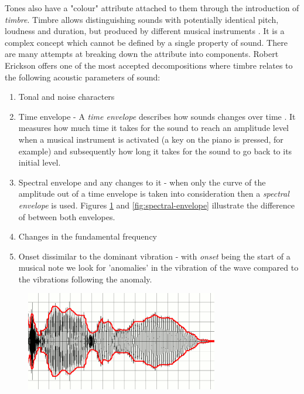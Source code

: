 Tones also have a "colour" attribute attached to them through the introduction
of \textit{timbre}. Timbre allows distinguishing sounds with potentially
identical pitch, loudness and duration, but produced by different musical
instruments \cite{klapuri2007signal}. It is a complex concept which cannot be
defined by a single property of sound. There are many attempts at breaking down
the attribute into components. Robert Erickson \cite{erickson1975sound} offers
one of the most accepted decompositions where timbre relates to the following
acoustic parameters of sound:
\begin{enumerate}
    \item Tonal and noise characters
    \item Time envelope - A \textit{time envelope} describes how sounds changes
    over time \cite{wiki:envelope}. It measures how much time it takes for the sound to reach an
    amplitude level when a musical instrument is activated (a key on the piano
    is pressed, for example) and subsequently how long it takes for the sound to
    go back to its initial level. 
    \item Spectral envelope and any changes to it - when only the curve of the
    amplitude out of a time envelope is taken into consideration then a
    \textit{spectral envelope} is used. Figures \ref{fig:time-envelope} and
    \ref{fig:spectral-envelope} illustrate the difference of between both envelopes.
    \item Changes in the fundamental frequency
    \item Onset dissimilar to the dominant vibration - with \textit{onset}
    being the start of a musical note we look for 'anomalies' in
    the vibration of the wave compared to the vibrations following the anomaly.

\end{enumerate}

\begin{figure}[H]
    \centering
    \includegraphics[width=0.75\textwidth]{BackgroundTheory/time_envelope.png}
    \label{fig:time-envelope}
\end{figure}

